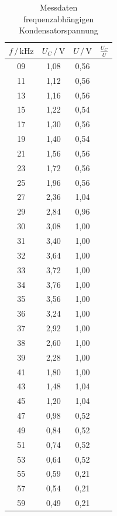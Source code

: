 \begin{table}
  \centering
  \caption{Messdaten frequenzabhängigen Kondensatorspannung}
  \label{tab:Messdaten2}
  \begin{tabular}{c c c c}
  \toprule
  $f \,/\, \si{\kilo\hertz}$ & $U_C \,/\, \si{\volt}$ & $U \,/\, \si{\volt}$ & $\frac{U_C}{U} $\\
  \midrule
  09 & 1,08 & 0,56\\
  11 & 1,12 & 0,56\\
  13 & 1,16 & 0,56\\
  15 & 1,22 & 0,54\\
  17 & 1,30 & 0,56\\
  19 & 1,40 & 0,54\\
  21 & 1,56 & 0,56\\
  23 & 1,72 & 0,56\\
  25 & 1,96 & 0,56\\
  27 & 2,36 & 1,04\\
  29 & 2,84 & 0,96\\
  30 & 3,08 & 1,00\\
  31 & 3,40 & 1,00\\
  32 & 3,64 & 1,00\\
  33 & 3,72 & 1,00\\
  34 & 3,76 & 1,00\\
  35 & 3,56 & 1,00\\
  36 & 3,24 & 1,00\\
  37 & 2,92 & 1,00\\
  38 & 2,60 & 1,00\\
  39 & 2,28 & 1,00\\
  41 & 1,80 & 1,00\\
  43 & 1,48 & 1,04\\
  45 & 1,20 & 1,04\\
  47 & 0,98 & 0,52\\
  49 & 0,84 & 0,52\\
  51 & 0,74 & 0,52\\
  53 & 0,64 & 0,52\\
  55 & 0,59 & 0,21\\
  57 & 0,54 & 0,21\\
  59 & 0,49 & 0,21\\
  \bottomrule
  \end{tabular}
  \end{table} 